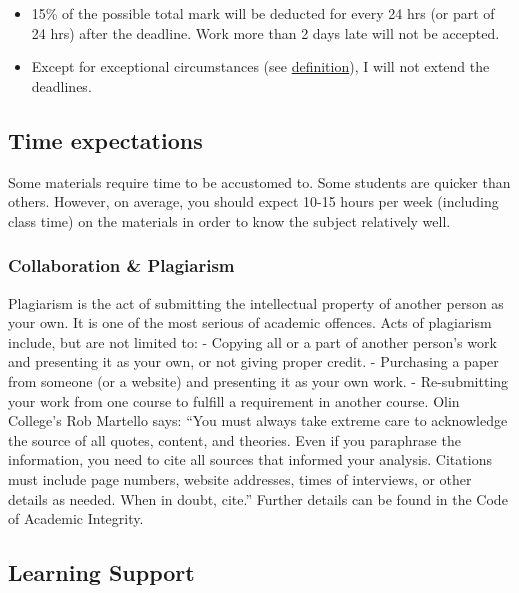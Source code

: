 \documentclass[
]{article}
\providecommand{\tightlist}{%
  \setlength{\itemsep}{0pt}\setlength{\parskip}{0pt}}
\begin{document}
\begin{itemize}
\tightlist
\item
  15\% of the possible total mark will be deducted for every 24 hrs (or part of 24 hrs) after the
  deadline. Work more than 2 days late will not be accepted.
\item
  Except for exceptional circumstances (see \href{https://onestop.fulbright.edu.vn/s/article/Exceptional-Circumstance}{definition}),
  I will not extend the deadlines.
\end{itemize}

\hypertarget{time-expectations}{%
\subsection*{Time expectations}\label{time-expectations}}

Some materials require time to be accustomed to. Some students are quicker than
others. However, on average, you should expect 10-15 hours per week (including class time)
on the materials in order to know the subject relatively well.

\hypertarget{collaboration-plagiarism}{%
\subsubsection*{Collaboration \& Plagiarism}\label{collaboration-plagiarism}}

Plagiarism is the act of submitting the intellectual property of another person as your own.
It is one of the most serious of academic offences. Acts of plagiarism include, but are not
limited to:
- Copying all or a part of another person's work and presenting it as your own, or not
giving proper credit.
- Purchasing a paper from someone (or a website) and presenting it as your own work.
- Re-submitting your work from one course to fulfill a requirement in another course.
Olin College's Rob Martello says: ``You must always take extreme care to acknowledge the
source of all quotes, content, and theories. Even if you paraphrase the information, you need
to cite all sources that informed your analysis. Citations must include page numbers, website
addresses, times of interviews, or other details as needed. When in doubt, cite.''
Further details can be found in the Code of Academic Integrity.

\hypertarget{learning-support}{%
\subsection*{Learning Support}\label{learning-support}}
\end{document}
